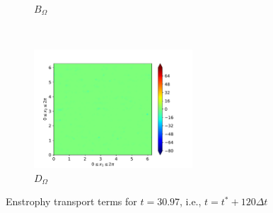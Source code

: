 \begin{figure}[H]
\begin{subfigure}{0.45\textwidth}
        \caption{$B_{\Omega}$}
    \end{subfigure}
    ~
    \begin{subfigure}{0.45\textwidth}
        \includegraphics[height=1.75in]{media/run-cds-65/D-enst-1460}
        \caption{$D_{\Omega}$}
    \end{subfigure}
    \caption{Enstrophy transport terms for $t=30.97$, i.e., $t=t^{\ast} + 120 \Delta t$}
\end{figure}

\newpage

